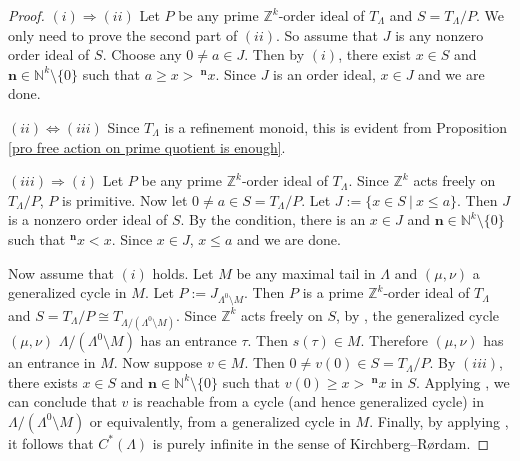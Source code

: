 \documentclass[a4paper,reqno,12pt]{amsart}
\numberwithin{equation}{section}
\theoremstyle{definition}
\theoremstyle{remark}
\newcommand{\N}{\mathbf{n}}
\begin{document}
\begin{proof}
$(i)\Rightarrow (ii)$ Let $P$ be any prime $\mathbb{Z}^k$-order ideal of $T_\Lambda$ and $S=T_\Lambda/{P}$. We only need to prove the second part of $(ii)$. So assume that $J$ is any nonzero order ideal of $S$. Choose any $0\neq a\in J$. Then by $(i)$, there exist $x\in S$ and $\N\in \mathbb{N}^k\setminus \{0\}$ such that $a\ge x>~^\N x$. Since $J$ is an order ideal, $x\in J$ and we are done.

$(ii)\Leftrightarrow (iii)$ Since $T_\Lambda$ is a refinement monoid, this is evident from Proposition \ref{pro free action on prime quotient is enough}. 

$(iii)\Rightarrow (i)$ Let $P$ be any prime $\mathbb{Z}^k$-order ideal of $T_\Lambda$. Since $\mathbb{Z}^k$ acts freely on $T_\Lambda/{P}$, $P$ is primitive. Now let $0\neq a\in S=T_\Lambda/{P}$. Let $J:=\{x\in S~|~x\le a\}$. Then $J$ is a nonzero order ideal of $S$. By the condition, there is an $x\in J$ and $\N\in \mathbb{N}^k\setminus \{0\}$ such that $^\N x<x$. Since $x\in J$, $x\le a$ and we are done.

Now assume that $(i)$ holds. Let $M$ be any maximal tail in $\Lambda$ and $(\mu,\nu)$ a generalized cycle in $M$. Let $P:=J_{\Lambda^0\setminus M}$. Then $P$ is a prime $\mathbb{Z}^k$-order ideal of $T_\Lambda$ and $S=T_\Lambda/{P}\cong T_{\Lambda/(\Lambda^0\setminus M)}$. Since $\mathbb{Z}^k$ acts freely on $S$, by \cite[Proposition 4.2.6$(ii)$]{HLM}, the generalized cycle $(\mu,\nu)$ $\Lambda/(\Lambda^0\setminus M)$ has an entrance $\tau$. Then $s(\tau)\in M$. Therefore $(\mu,\nu)$ has an entrance in $M$. Now suppose $v\in M$. Then $0\neq v(0)\in S=T_\Lambda/{P}$. By $(iii)$, there exists $x\in S$ and $\N\in \mathbb{N}^k\setminus \{0\}$ such that $v(0)\ge x>~^\N x$ in $S$. Applying \cite[Lemma 4.2.1]{HLM}, we can conclude that $v$ is reachable from a cycle (and hence generalized cycle) in $\Lambda/(\Lambda^0\setminus M)$ or equivalently, from a generalized cycle in $M$. Finally, by applying \cite[Theorem 3.9]{PaskNew}, it follows that $C^*(\Lambda)$ is purely infinite in the sense of Kirchberg--R\o rdam. 


\end{proof}
\end{document}
